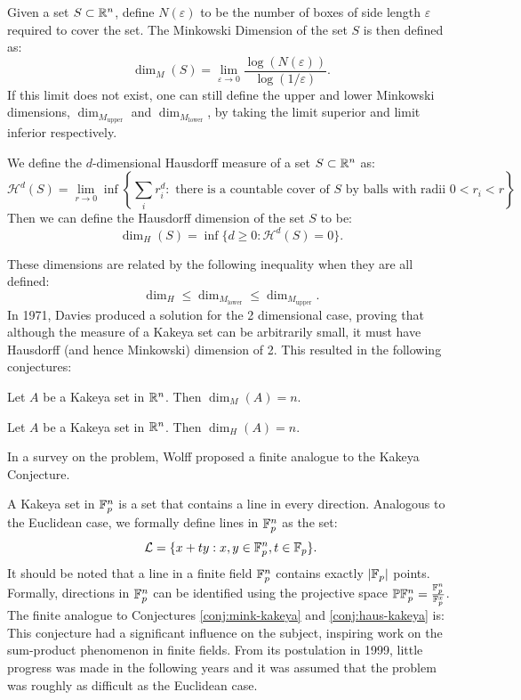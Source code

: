 \begin{definition}
Given a set $S \subset \mathbb R^n$, define $N(\varepsilon)$ to be the number of boxes of side length $\varepsilon$ required to cover the set.
The Minkowski Dimension of the set $S$ is then defined as:
$$\dim_M (S) = \lim_{\varepsilon \to 0} \frac{\log( N(\varepsilon))}{\log (1/\varepsilon)}.$$
If this limit does not exist, one can still define the upper and lower Minkowski dimensions, 
$\dim_{M_{\text{upper}}}$ and $\dim_{M_{\text{lower}}}$, by taking the limit superior and limit inferior respectively.
\end{definition}
\begin{definition}
    We define the $d$-dimensional Hausdorff measure of a set $S \subset \mathbb R^n$ as: 
    $$\mathcal{H}^d(S)=\lim_{r \to 0} \inf \left\{\sum_i r_i^d:\text{ there is a countable cover of } S\text{ by balls with radii } 0 < r_i < r\right\}$$
    Then we can define the Hausdorff dimension of the set $S$ to be:
    $$\dim_H (S) = \inf \{ d \geq 0 : \mathcal{H}^d(S) = 0 \}.   $$
\end{definition}
These dimensions are related by the following inequality when they are all defined:
$$\dim_H \leq \dim_{M_{\text{lower}}} \leq \dim_{M_{\text{upper}}}.$$
In 1971, Davies produced a solution for the 2 dimensional case, proving that
although the measure of a Kakeya set can be arbitrarily small, it must have Hausdorff (and hence Minkowski) dimension of 2.\cite{davies1971some}
This resulted in the following conjectures:
\begin{conjecture}
    Let $A$ be a Kakeya set in $\mathbb R^n$. Then $\dim_M (A) = n$. \label{conj:mink-kakeya}
\end{conjecture}
\begin{conjecture}
    Let $A$ be a Kakeya set in $\mathbb R^n$. Then $\dim_H (A) = n$. \label{conj:haus-kakeya}
\end{conjecture}
In a survey on the problem, Wolff proposed a finite analogue to the Kakeya Conjecture.\cite{wolff1999recent} 

A Kakeya set in $\mathbb{ F}_p^n$ is a set that contains a line in every direction. Analogous to the Euclidean case, we formally define lines in $\mathbb{ F}_p^n$  as the set:
$$\mathcal{L} = \{x+ty : x,y \in \mathbb{ F}_p^n,  t \in \mathbb{ F}_p \}.$$
It should be noted that a line in a finite field $\mathbb{ F}_p^n$ contains exactly $|\mathbb{ F}_p|$ points.
Formally, directions in $\mathbb{ F}_p^n$ can be identified using the projective space $\mathbb{P}\mathbb{ F}_p^n  = \frac{\mathbb{ F}_p^n}{\mathbb{ F}_p^x}$.
The finite analogue to Conjectures \ref{conj:mink-kakeya} and \ref{conj:haus-kakeya} is:
This conjecture had a significant influence on the subject, inspiring work on the sum-product phenomenon in finite fields. From its postulation in 1999,
little progress was made in the following years and it was assumed that the problem was roughly as difficult as the Euclidean case. 

